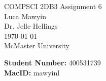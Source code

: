 \documentclass[letterpaper]{article}
\theoremstyle{plain}
\theoremstyle{definition}
\theoremstyle{remark}
\begin{document}

\begin{titlepage}
    \centering
    \vspace*{3cm}
    
    {\Huge COMPSCI 2DB3 Assignment 6}\\[2cm]
    
    {\large Luca Mawyin}\\[0.5cm]
    
    {\large Dr. Jelle Hellings}\\[0.5cm]

    {\large \today}\\[2cm]

    {\Large McMaster University}

    \vfill
    \begin{flushleft}

        {\large \textbf{Student Number: }400531739}\\[0.5cm]
        {\large \textbf{MacID: }mawyinl}
    \end{flushleft}

\end{titlepage}
\renewcommand{\thesection}{Part \Roman{section}}
\renewcommand{\thesubsection}{Problem \arabic{section}}
\renewcommand{\thesubsubsection}{P\arabic{section}.\arabic{subsubsection}}

\section{}
\subsection{}
\subsubsection{}
\end{document}
